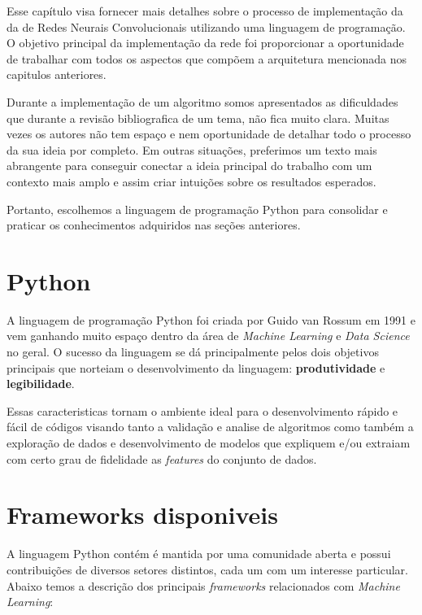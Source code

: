 \documentclass[
	12pt,				%
	oneside,			%
	a4paper,			%
	english,			%
	french,				%
	spanish,			%
	brazil,				%
	]{abntex2}
\begin{document}
\par Esse capítulo visa fornecer mais detalhes sobre o processo de implementação da  da de Redes Neurais Convolucionais utilizando uma linguagem de programação. O objetivo principal da implementação da rede foi proporcionar a oportunidade de trabalhar com todos os aspectos que compõem a arquitetura mencionada nos capitulos anteriores.

\par Durante a implementação de um algoritmo somos apresentados as dificuldades que durante a revisão bibliografica de um tema, não fica muito clara. Muitas vezes os autores não tem espaço e nem oportunidade de detalhar todo o processo da sua ideia por completo. Em outras situações, preferimos um texto mais abrangente para conseguir conectar a ideia principal do trabalho com um contexto mais amplo e assim criar intuições sobre os resultados esperados.

\par Portanto, escolhemos a linguagem de programação Python para consolidar e praticar os conhecimentos adquiridos nas seções anteriores.

\section{Python}

\par A linguagem de programação Python foi criada por Guido van Rossum em 1991 e vem ganhando muito espaço dentro da área de \textit{Machine Learning} e \textit{Data Science} no geral. O sucesso da linguagem se dá principalmente pelos dois objetivos principais que norteiam o desenvolvimento da linguagem: \textbf{produtividade} e \textbf{legibilidade}.

\par Essas caracteristicas tornam o ambiente ideal para o desenvolvimento rápido e fácil de códigos visando tanto a validação e analise de algoritmos como também a exploração de dados e desenvolvimento de modelos que expliquem e/ou extraiam com certo grau de fidelidade as \textit{features} do conjunto de dados.

\section{Frameworks disponiveis}

\par A linguagem Python contém é mantida por uma comunidade aberta e possui contribuições de diversos setores distintos, cada um com um interesse particular. Abaixo temos a descrição dos principais \textit{frameworks} relacionados com \textit{Machine Learning}:
\end{document}

